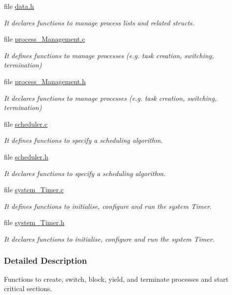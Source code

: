 \begin{DoxyCompactItemize}
file \hyperlink{data_8h}{data.\+h}
\begin{DoxyCompactList}\small\item\em It declares functions to manage process lists and related structs. \end{DoxyCompactList}\item 
file \hyperlink{process__Management_8c}{process\+\_\+\+Management.\+c}
\begin{DoxyCompactList}\small\item\em It defines functions to manage processes (e.\+g. task creation, switching, termination) \end{DoxyCompactList}\item 
file \hyperlink{process__Management_8h}{process\+\_\+\+Management.\+h}
\begin{DoxyCompactList}\small\item\em It declares functions to manage processes (e.\+g. task creation, switching, termination) \end{DoxyCompactList}\item 
file \hyperlink{scheduler_8c}{scheduler.\+c}
\begin{DoxyCompactList}\small\item\em It defines functions to specify a scheduling algorithm. \end{DoxyCompactList}\item 
file \hyperlink{scheduler_8h}{scheduler.\+h}
\begin{DoxyCompactList}\small\item\em It declares functions to specify a scheduling algorithm. \end{DoxyCompactList}\item 
file \hyperlink{system__Timer_8c}{system\+\_\+\+Timer.\+c}
\begin{DoxyCompactList}\small\item\em It defines functions to initialise, configure and run the system Timer. \end{DoxyCompactList}\item 
file \hyperlink{system__Timer_8h}{system\+\_\+\+Timer.\+h}
\begin{DoxyCompactList}\small\item\em It declares functions to initialise, configure and run the system Timer. \end{DoxyCompactList}\end{DoxyCompactItemize}


\subsubsection{Detailed Description}
Functions to create, switch, block, yield, and terminate processes and start critical sections. 

